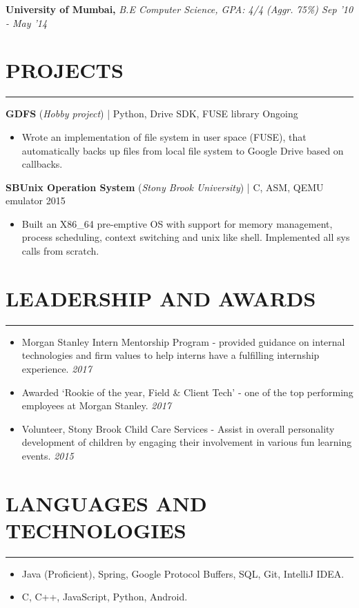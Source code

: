 \documentclass[12pt]{article}
\newcommand{\sectionHeading}[1]{
\section*{\small{#1}}
\vspace{-8pt}
\hrule
\vspace{8pt}
}
\newcommand {\projectSectionSubheading}[4]{
    \noindent \small{\textbf{#1} (\textit{#2}) | #4 \hfill #3}\vspace{-6pt}
}
\newcommand{\educationSectionSubheading}[3]{
    \noindent \small{\textbf{#1, }\textit{#2 \hfill #3}} \vspace{-20pt}\\
}
\newcommand{\sectionListStart}{\begin{itemize}[label={\small{\textbullet}},noitemsep]}
\newcommand{\sectionListEnd}{\end{itemize}}
\newcommand{\sectionListItem}[1]{\item \small{#1}}
\newcommand{\sectionListItemWithDate}[2]{\item \small{#1 \hfill \textit{#2}} \\\vspace{-10pt}}
\begin{document}
\educationSectionSubheading
{University of Mumbai}{B.E Computer Science, GPA: 4/4 (Aggr. 75\%)}{Sep '10 - May '14}


\sectionHeading{PROJECTS}
\projectSectionSubheading{GDFS}{Hobby project}{Ongoing}{Python, Drive SDK, FUSE library}
\sectionListStart
    \sectionListItem
        Wrote an implementation of file system in user space (FUSE), that automatically backs up files from local file system to Google Drive based on callbacks. 
\sectionListEnd


\projectSectionSubheading{SBUnix Operation System}{Stony Brook University}{2015}{C, ASM, QEMU emulator}
\sectionListStart
    \sectionListItem
        Built an X86\_64 pre-emptive OS with support for memory management, process scheduling, context switching and unix like shell. Implemented all sys calls from scratch. 
        

\sectionListEnd

\sectionHeading{LEADERSHIP AND AWARDS}
\sectionListStart
    \sectionListItemWithDate
        {Morgan Stanley Intern Mentorship Program - provided guidance on internal technologies and firm values to help interns have a fulfilling internship experience.}{2017} 
    \sectionListItemWithDate
        {Awarded `Rookie of the year, Field \& Client Tech' - one of the top performing employees at Morgan Stanley.}{2017}
    \sectionListItemWithDate
        {Volunteer, Stony Brook Child Care Services - Assist in overall personality development of children by engaging their involvement in various fun learning events.}{2015}
\sectionListEnd

\sectionHeading{LANGUAGES AND TECHNOLOGIES}
\sectionListStart
    \sectionListItem
        Java (Proficient), Spring, Google Protocol Buffers, SQL, Git, IntelliJ IDEA.
    \sectionListItem
        C, C++, JavaScript, Python, Android. 
\sectionListEnd

\end{document}
